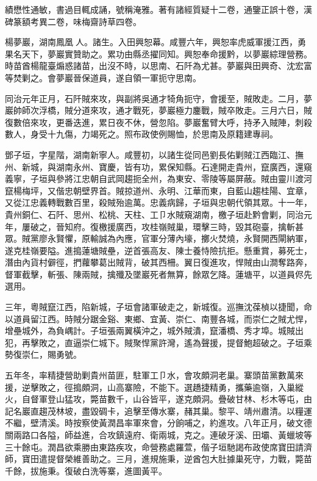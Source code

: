 \begin{pinyinscope}
績懋性通敏，書過目輒成誦，號稱淹雅。著有諸經質疑十二卷，通鑒正誤十卷，漢碑篆額考異二卷，味梅齋詩草四卷。

楊夢巖，湖南鳳凰人。諸生。入田興恕幕。咸豐六年，興恕率虎威軍援江西，勇果名天下，夢巖實贊助之。累功由縣丞擢同知。興恕奉命援黔，以夢巖綜理營務。時苗酋楊龍臺煽惑諸苗，出沒不時，以思南、石阡為尤甚。夢巖與田興奇、沈宏富等焚剿之。會夢巖晉保道員，遂自領一軍扼守思南。

同治元年正月，石阡賊來攻，與副將吳通才犄角扼守，會援至，賊敗走。二月，夢巖帥師次浮橋，賊分道來攻，通才戰死，夢巖極力鏖戰，賊卒敗走。三月六日，賊復數倍來攻，更番迭進，累日夜不休，營忽陷。夢巖奮臂大呼，持矛入賊陣，刺殺數人，身受十九傷，力竭死之。照布政使例賜恤，於思南及原籍建專祠。

鄧子垣，字星階，湖南新寧人。咸豐初，以諸生從同邑劉長佑剿賊江西臨江、撫州、新城，與湖南永州、寶慶，皆有功，累保知縣。石達開走貴州，竄廣西，還窺義寧，子垣與參將江忠朝自武岡趨扼全州，為東安、零陵等屬屏蔽。賊由靈川渡河竄楊梅坪，又偕忠朝壁界首。賊掠道州、永明、江華而東，自藍山趨桂陽、宜章，又從江忠義轉戰數百里，殺賊殆逾萬。忠義病歸，子垣與忠朝代領其眾。十一年，貴州銅仁、石阡、思州、松桃、天柱、工⼙水賊窺湖南，檄子垣赴黔會剿，同治元年，屢破之，晉知府。復檄援廣西，攻桂嶺賊巢，環擊三時，毀其砲臺，擒斬甚眾。賊黨廖永賢懼，原輸誠為內應，官軍分薄內壕，擲火焚燒，永賢開西閘納軍，遂克桂嶺要隘。進搗蓮塘賊壘，逆首張高友、陳士養恃險抗拒。懸重賞，募死士，潛由內貨村僻徑，捫蘿攀葛出賊背，破其西柵。翼日復進攻，悍賊由山澗奪路奔，督軍截擊，斬張、陳兩賊，擒殲及墜巖死者無算，餘眾乞降。蓮塘平，以道員侭先選用。

三年，粵賊竄江西，陷新城，子垣會諸軍破走之，新城復。巡撫沈葆楨以捷聞，命以道員留江西。時賊分踞金谿、東鄉、宜黃、崇仁、南豐各城，而崇仁之賊尤悍，增壘城外，為負嵎計。子垣張兩翼橫沖之，城外賊潰，竄潘橋、秀才埠。城賊出犯，再擊敗之，直逼崇仁城下。賊聚悍黨許灣，遙為聲援，提督鮑超破之。子垣乘勢復崇仁，賜勇號。

五年冬，率精捷營助剿貴州苗匪，駐軍工⼙水，會攻頗洞老巢。寨頭苗黨數萬來援，逆擊敗之，徑搗頗洞，山高寨險，不能下。選趫捷精勇，攜藥逾嶺，入巢縱火，自督軍登山猛攻，斃苗數千，山谷皆平，遂克頗洞。疊破甘林、杉木等屯，由記名巖直趨茂林坡，盡毀碉卡，追擊至傳水寨，赭其巢。黎平、靖州肅清。以糧運不繼，壁清溪。時按察使黃潤昌率軍來會，分餉哺之，約進攻。八年正月，破文德關兩路口各隘，師益進，合攻鎮遠府、衛兩城，克之。連破牙溪、田壩、黃蠟坡等三十餘屯。潤昌欲乘勝由東路疾攻，命營務處羅萱，偕子垣馳謁布政使席寶田請濟師，寶田遣提督榮維善助之。三月，進規施秉，逆酋包大肚據巢死守，力戰，斃苗千餘，拔施秉。復破白洗等寨，進圖黃平。


\end{pinyinscope}
